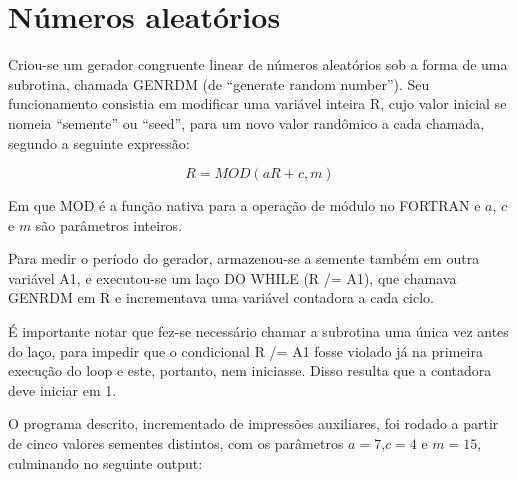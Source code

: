 \documentclass{article}
\begin{document}
\section{Números aleatórios}

Criou-se um gerador congruente linear de números aleatórios sob a forma de uma subrotina, chamada GENRDM (de ``generate random number''). Seu funcionamento consistia em modificar uma variável inteira R, cujo valor inicial se nomeia ``semente'' ou ``seed'', para um novo valor randômico a cada chamada, segundo a seguinte expressão:


\begin{displaymath}
  \label{eq:gerador}
  R=MOD(aR+c, m)
\end{displaymath}

Em que MOD é a função nativa para a operação de módulo no FORTRAN e \(a\), \(c\) e \(m\) são parâmetros inteiros. \par
Para medir o período do gerador, armazenou-se a semente também em outra variável A1, e executou-se um laço DO WHILE (R /= A1), que chamava GENRDM em R e incrementava uma variável contadora a cada ciclo.\par
É importante notar que fez-se necessário chamar a subrotina uma única vez antes do laço, para impedir que o condicional R /= A1 fosse violado já na primeira execução do loop e este, portanto, nem iniciasse. Disso resulta que a contadora deve iniciar em 1.\par
O programa descrito, incrementado de impressões auxiliares, foi rodado a partir de cinco valores sementes distintos, com os parâmetros \(a=7\),\(c=4\) e \(m = 15\), culminando no seguinte output:
\end{document}
